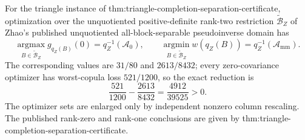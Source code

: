 For the triangle instance of thm:triangle-completion-separation-certificate, optimization over the unquotiented positive-definite rank-two restriction \(\widetilde{\mathcal B}_Z\) of Zhao's published unquotiented all-block-separable pseudoinverse domain has
\[
\operatorname*{argmax}_{B\in\widetilde{\mathcal B}_Z}g_{q_Z(B)}(0)=q_Z^{-1}(\mathcal A_0),
\qquad
\operatorname*{argmin}_{B\in\widetilde{\mathcal B}_Z}w(q_Z(B))=q_Z^{-1}(\mathcal A_{\mathrm{mm}}).
\]
The corresponding values are \(31/80\) and \(2613/8432\); every zero-covariance optimizer has worst-copula loss \(521/1200\), so the exact reduction is
\[
\frac{521}{1200}-\frac{2613}{8432}=\frac{4912}{39525}>0.
\]
The optimizer sets are enlarged only by independent nonzero column rescaling.  The published rank-zero and rank-one conclusions are given by thm:triangle-completion-separation-certificate.